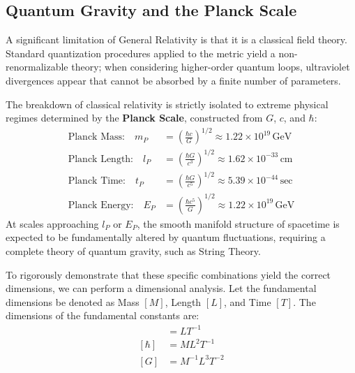 \documentclass[11pt, a4paper]{report}
\begin{document}
\subsection{Quantum Gravity and the Planck Scale}

A significant limitation of General Relativity is that it is a classical field theory. Standard quantization procedures applied to the metric yield a non-renormalizable theory; when considering higher-order quantum loops, ultraviolet divergences appear that cannot be absorbed by a finite number of parameters. 

The breakdown of classical relativity is strictly isolated to extreme physical regimes determined by the \textbf{Planck Scale}, constructed from $G$, $c$, and $\hbar$:
\begin{align}
\text{Planck Mass:} \quad m_{P} &= \left(\frac{\hbar c}{G}\right)^{1/2} \approx 1.22 \times 10^{19} \, \text{GeV} \\
\text{Planck Length:} \quad l_{P} &= \left(\frac{\hbar G}{c^{3}}\right)^{1/2} \approx 1.62 \times 10^{-33} \, \text{cm} \\
\text{Planck Time:} \quad t_{P} &= \left(\frac{\hbar G}{c^{5}}\right)^{1/2} \approx 5.39 \times 10^{-44} \, \text{sec} \\
\text{Planck Energy:} \quad E_{P} &= \left(\frac{\hbar c^{5}}{G}\right)^{1/2} \approx 1.22 \times 10^{19} \, \text{GeV}
\end{align}
At scales approaching $l_{P}$ or $E_{P}$, the smooth manifold structure of spacetime is expected to be fundamentally altered by quantum fluctuations, requiring a complete theory of quantum gravity, such as String Theory.

To rigorously demonstrate that these specific combinations yield the correct dimensions, we can perform a dimensional analysis. Let the fundamental dimensions be denoted as Mass $[M]$, Length $[L]$, and Time $[T]$. The dimensions of the fundamental constants are:
\begin{align}
[c] &= L T^{-1} \\
[\hbar] &= M L^{2} T^{-1} \\
[G] &= M^{-1} L^{3} T^{-2}
\end{align}
\end{document}
